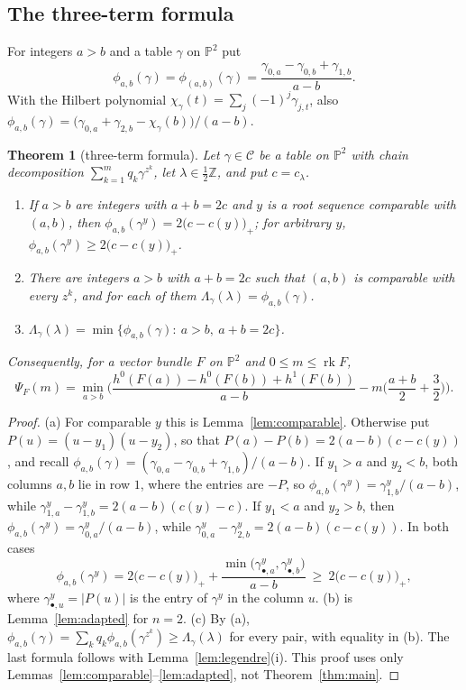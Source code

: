 \documentclass[11pt]{amsart}
\newtheorem{theorem}{Theorem}[section]
\theoremstyle{definition}
\theoremstyle{remark}
\newcommand{\PP}{\mathbb{P}}
\newcommand{\ZZ}{\mathbb{Z}}
\newcommand{\CC}{\mathcal{C}}
\DeclareMathOperator{\rk}{rk}
\begin{document}
\subsection{The three-term formula}
For integers $a>b$ and a table $\gamma$ on $\PP^2$ put
\[
\phi_{a,b}(\gamma)=\phi_{(a,b)}(\gamma)=\frac{\gamma_{0,a}-\gamma_{0,b}+\gamma_{1,b}}{a-b}.
\]
With the Hilbert polynomial $\chi_\gamma(t)=\sum_j(-1)^j\gamma_{j,t}$, also $\phi_{a,b}(\gamma)=\big(\gamma_{0,a}+\gamma_{2,b}-\chi_\gamma(b)\big)/(a-b)$.

\begin{theorem}[three-term formula]\label{thm:three}
Let $\gamma\in\CC$ be a table on $\PP^2$ with chain decomposition $\sum_{k=1}^mq_k\gamma^{z^k}$, let $\lambda\in\frac12\ZZ$, and put $c=c_\lambda$.
\begin{enumerate}[label=\textup{(\alph*)}]
\item If $a>b$ are integers with $a+b=2c$ and $y$ is a root sequence comparable with $(a,b)$, then $\phi_{a,b}(\gamma^y)=2\big(c-c(y)\big)_+$; for arbitrary $y$, $\phi_{a,b}(\gamma^y)\ge2\big(c-c(y)\big)_+$.
\item There are integers $a>b$ with $a+b=2c$ such that $(a,b)$ is comparable with every $z^k$, and for each of them $\Lambda_\gamma(\lambda)=\phi_{a,b}(\gamma)$.
\item $\Lambda_\gamma(\lambda)=\min\{\phi_{a,b}(\gamma):\ a>b,\ a+b=2c\}$.
\end{enumerate}
Consequently, for a vector bundle $F$ on $\PP^2$ and $0\le m\le\rk F$,
\[
\Psi_F(m)=\min_{a>b}\Big(\frac{h^0(F(a))-h^0(F(b))+h^1(F(b))}{a-b}-m\Big(\frac{a+b}2+\frac32\Big)\Big).
\]
\end{theorem}

\begin{proof}
(a) For comparable $y$ this is Lemma~\ref{lem:comparable}. Otherwise put $P(u)=(u-y_1)(u-y_2)$, so that $P(a)-P(b)=2(a-b)(c-c(y))$, and recall $\phi_{a,b}(\gamma)=(\gamma_{0,a}-\gamma_{0,b}+\gamma_{1,b})/(a-b)$. If $y_1>a$ and $y_2<b$, both columns $a,b$ lie in row $1$, where the entries are $-P$, so $\phi_{a,b}(\gamma^y)=\gamma^y_{1,b}/(a-b)$, while $\gamma^y_{1,a}-\gamma^y_{1,b}=2(a-b)(c(y)-c)$. If $y_1<a$ and $y_2>b$, then $\phi_{a,b}(\gamma^y)=\gamma^y_{0,a}/(a-b)$, while $\gamma^y_{0,a}-\gamma^y_{2,b}=2(a-b)(c-c(y))$. In both cases
\begin{equation}\label{eq:incomparable}
\phi_{a,b}(\gamma^y)=2\big(c-c(y)\big)_++\frac{\min\big(\gamma^y_{\bullet,a},\gamma^y_{\bullet,b}\big)}{a-b}\ \ge\ 2\big(c-c(y)\big)_+,
\end{equation}
where $\gamma^y_{\bullet,u}=|P(u)|$ is the entry of $\gamma^y$ in the column $u$. (b) is Lemma~\ref{lem:adapted} for $n=2$. (c) By (a), $\phi_{a,b}(\gamma)=\sum_kq_k\phi_{a,b}(\gamma^{z^k})\ge\Lambda_\gamma(\lambda)$ for every pair, with equality in (b). The last formula follows with Lemma~\ref{lem:legendre}(i). This proof uses only Lemmas~\ref{lem:comparable}--\ref{lem:adapted}, not Theorem~\ref{thm:main}.
\end{proof}
\end{document}
